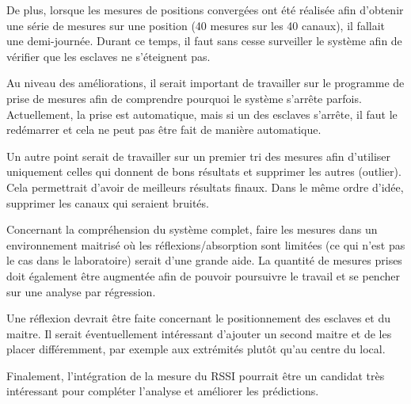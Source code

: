 De plus, lorsque les mesures de positions convergées ont été réalisée afin d'obtenir une série de mesures sur une position (40 mesures sur les 40 canaux), il fallait une demi-journée. Durant ce temps, il faut sans cesse surveiller le système afin de vérifier que les esclaves ne s'éteignent pas. 

Au niveau des améliorations, il serait important de travailler sur le programme de prise de mesures afin de comprendre pourquoi le système s'arrête parfois. Actuellement, la prise est automatique, mais si un des esclaves s'arrête, il faut le redémarrer et cela ne peut pas être fait de manière automatique. 

Un autre point serait de travailler sur un premier tri des mesures afin d'utiliser uniquement celles qui donnent de bons résultats et supprimer les autres (outlier). Cela permettrait d'avoir de meilleurs résultats finaux. Dans le même ordre d'idée, supprimer les canaux qui seraient bruités.

Concernant la compréhension du système complet, faire les mesures dans un environnement maitrisé où les réflexions/absorption sont limitées (ce qui n'est pas le cas dans le laboratoire) serait d'une grande aide. La quantité de mesures prises doit également être augmentée afin de pouvoir poursuivre le travail et se pencher sur une analyse par régression. 

Une réflexion devrait être faite concernant le positionnement des esclaves et du maitre. Il serait éventuellement intéressant d'ajouter un second maitre et de les placer différemment, par exemple aux extrémités plutôt qu'au centre du local. 

Finalement, l'intégration de la mesure du RSSI pourrait être un candidat très intéressant pour compléter l'analyse et améliorer les prédictions. 







